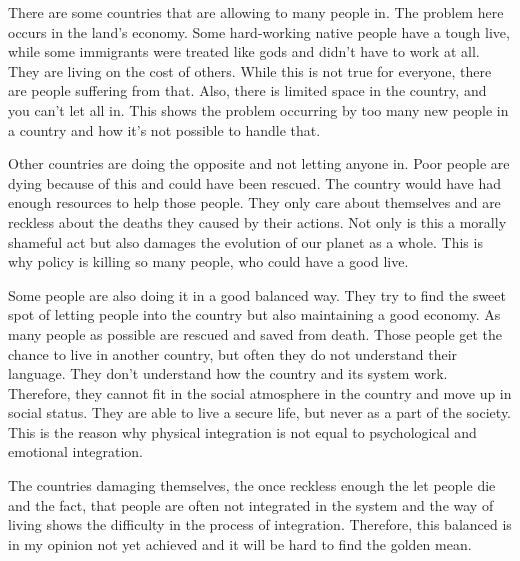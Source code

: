 \documentclass{article}
\begin{document}
There are some countries that are allowing to many people in. The problem here occurs in the land's economy. Some hard-working native people have a tough live, while some immigrants were treated like gods and didn’t have to work at all. They are living on the cost of others. While this is not true for everyone, there are people suffering from that. Also, there is limited space in the country, and you can’t let all in. This shows the problem occurring by too many new people in a country and how it’s not possible to handle that.

Other countries are doing the opposite and not letting anyone in. Poor people are dying because of this and could have been rescued. The country would have had enough resources to help those people. They only care about themselves and are reckless about the deaths they caused by their actions. Not only is this a morally shameful act but also damages the evolution of our planet as a whole. This is why policy is killing so many people, who could have a good live.

Some people are also doing it in a good balanced way. They try to find the sweet spot of letting people into the country but also maintaining a good economy. As many people as possible are rescued and saved from death. Those people get the chance to live in another country, but often they do not understand their language. They don’t understand how the country and its system work. Therefore, they cannot fit in the social atmosphere in the country and move up in social status. They are able to live a secure life, but never as a part of the society. This is the reason why physical integration is not equal to psychological and emotional integration.

The countries damaging themselves, the once reckless enough the let people die and the fact, that people are often not integrated in the system and the way of living shows the difficulty in the process of integration. Therefore, this balanced is in my opinion not yet achieved and it will be hard to find the golden mean.
\end{document}
